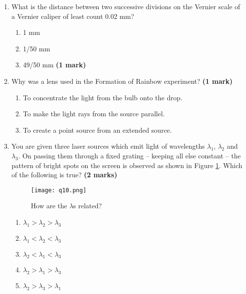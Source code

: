 \begin{enumerate}
\item What is the distance between two successive divisions on the Vernier scale of a Vernier caliper of least count 0.02 mm?
\begin{enumerate}
\item 1 mm
\item 1/50 mm
\item 49/50 mm \hfill \textbf{(1 mark)}
\end{enumerate}




\item Why was a lens used in the Formation of Rainbow experiment? \hfill \textbf{(1 mark)}

\begin{enumerate}
\item To concentrate the light from the bulb onto the drop.
\item To make the light rays from the source parallel.
\item To create a point source from an extended source.
\end{enumerate}

\item You are given three laser sources which emit light of wavelengths $\lambda_1$, $\lambda_2$ and $\lambda_3$. On passing them through a fixed grating -- keeping all else constant -- the pattern of bright spots on the screen is observed as shown in Figure \ref{lambdaGratings}. Which of the following is true? \hfill \textbf{(2 marks)}

\renewcommand{\figurename}{\hspace{4cm} Figure}


\begin{figure}[!htb]\hspace{2cm}
\centering
\hspace{2cm}
\texttt{[image: q10.png]}%
\hfill\caption{How are the $\lambda$s related?}
\label{lambdaGratings}
\end{figure}
\vspace{-4cm}
\begin{enumerate}
\item $\lambda_1 > \lambda_2 > \lambda_3$
\item $\lambda_1 < \lambda_2 < \lambda_3$
\item $\lambda_2 < \lambda_1 < \lambda_3$
\item $\lambda_2 > \lambda_1 > \lambda_3$
\item $\lambda_2 > \lambda_3 > \lambda_1$
\end{enumerate}
\vspace{0.5cm}



\end{enumerate}
